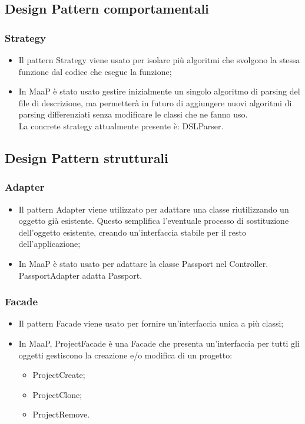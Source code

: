 \subsection{Design Pattern comportamentali} 
\subsubsection{Strategy}
\begin{itemize}
\item {} Il pattern Strategy viene usato per isolare più algoritmi che svolgono la stessa funzione dal codice che esegue la funzione; 
\item {} In MaaP è stato usato gestire inizialmente un singolo algoritmo di parsing del file di descrizione, ma permetterà in futuro di aggiungere nuovi algoritmi di parsing differenziati senza modificare le classi che ne fanno uso.\\
La concrete strategy attualmente presente è: DSLParser.
\end{itemize}

\subsection{Design Pattern strutturali}
\subsubsection{Adapter}
\begin{itemize}
\item {} Il pattern Adapter viene utilizzato per adattare una classe riutilizzando un oggetto già esistente. Questo semplifica l'eventuale processo di sostituzione dell'oggetto esistente, creando un'interfaccia stabile per il resto dell'applicazione; 
\item {} In MaaP è stato usato per adattare la classe Passport nel Controller. PassportAdapter adatta Passport.
\end{itemize}

\subsubsection{Facade}
\begin{itemize}
\item {} Il pattern Facade viene usato per fornire un'interfaccia unica a più classi; 
\item {} In MaaP, ProjectFacade è una Facade che presenta un'interfaccia per tutti gli oggetti gestiscono la creazione e/o modifica di un progetto:\\
\begin{itemize}
\item ProjectCreate;
\item ProjectClone;
\item ProjectRemove.
\end{itemize}
\end{itemize}

